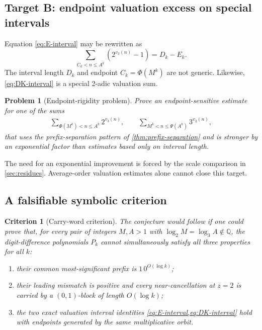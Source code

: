 \documentclass[11pt]{article}
\newtheorem{problem}[theorem]{Problem}
\newtheorem{criterion}[theorem]{Criterion}
\theoremstyle{definition}
\newcommand{\Q}{\mathbb Q}
\begin{document}
\subsection{Target B: endpoint valuation excess on special intervals}

Equation \cref{eq:E-interval} may be rewritten as
\begin{equation}\label{eq:valuation-excess}
 \sum_{C_k<n\le A^k}\left(2^{v_3(n)}-1\right)=D_k-E_k.
\end{equation}
The interval length \(D_k\) and endpoint \(C_k=\Phi(M^k)\) are not generic.
Likewise, \cref{eq:DK-interval} is a special 2-adic valuation sum.

\begin{problem}[Endpoint-rigidity problem]\label{prob:endpoint-rigidity}
Prove an endpoint-sensitive estimate for one of the sums
\begin{align*}
 \sum_{\Phi(M^k)<n\le A^k}2^{v_3(n)},
 \qquad
 \sum_{M^k<n\le\Psi(A^k)}3^{v_2(n)},
\end{align*}
that uses the prefix-separation pattern of \cref{thm:prefix-separation} and
is stronger by an exponential factor than estimates based only on interval
length.
\end{problem}

The need for an exponential improvement is forced by the scale comparison in
\cref{sec:residues}.  Average-order valuation estimates alone cannot close
this target.

\subsection{A falsifiable symbolic criterion}

\begin{criterion}[Carry-word criterion]\label{crit:carry-word}
The conjecture would follow if one could prove that, for every pair of
integers \(M,A>1\) with \(\log_2M=\log_3A\notin\Q\), the digit-difference
polynomials \(P_k\) cannot simultaneously satisfy all three properties for
all \(k\):
\begin{enumerate}[label=(\roman*)]
\item their common most-significant prefix is \(1\,0^{O(\log k)}\);
\item their leading mismatch is positive and every near-cancellation at
\(z=2\) is carried by a \((0,1)\)-block of length \(O(\log k)\);
\item the two exact valuation interval identities
\cref{eq:E-interval,eq:DK-interval} hold with endpoints generated by the
same multiplicative orbit.
\end{enumerate}
\end{criterion}
\end{document}
